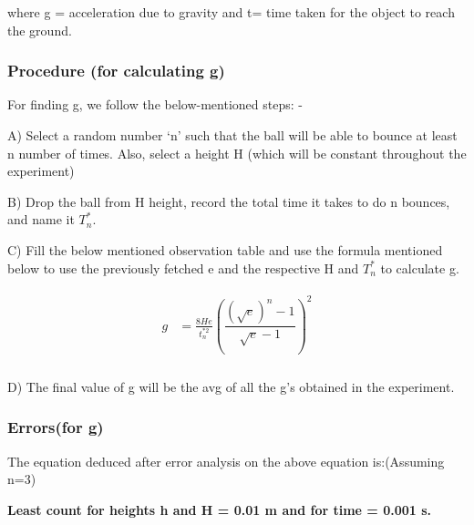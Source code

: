 \documentclass[11pt]{scrartcl} %
\begin{document}
where g = acceleration due to gravity and t= time taken for the object to reach the ground. \par

\subsubsection{Procedure (for calculating g)}
For finding g, we follow the below-mentioned steps: - \par

A) Select a random number ‘n’ such that the ball will be able to bounce at least n number of times. Also, select a height H (which will be constant throughout the experiment)\par

B) Drop the ball from H height, record the total time it takes to do n bounces, and name it $T_n^*$. \par

C) Fill the below mentioned observation table and use the formula mentioned below to use the previously fetched e and the respective H and $T_n^*$ to calculate g. \par
\begin{align} 
	\begin{split}
		g &= \frac{8He}{t_{n}^{*2}}\left(\dfrac{(\sqrt{e})^n-1}{\sqrt{e}-1}\right)^2\\
	\end{split}					
\end{align}
	 
D) The final value of g will be the avg of all the g’s obtained in the experiment. \par

\subsubsection{Errors(for g)}
The equation deduced after error analysis on the above equation is:(Assuming n=3)\par
\textbf{Least count for heights h and H = 0.01 m and for time = 0.001 s.}\par
\end{document}
